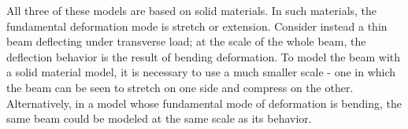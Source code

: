 All three of these models are based on solid materials.
In such materials, the fundamental deformation mode is stretch or extension.
Consider instead a thin beam deflecting under transverse load; at the scale of the whole beam, the deflection behavior is the result of bending deformation.
To model the beam with a solid material model, it is necessary to use a much smaller scale - one in which the beam can be seen to stretch on one side and compress on the other.
Alternatively, in a model whose fundamental mode of deformation is bending, the same beam could be modeled at the same scale as its behavior.
